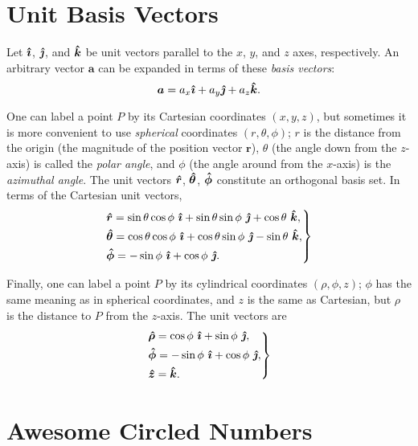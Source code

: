 \documentclass{article}
\begin{document}
\section{Unit Basis Vectors}

Let $\bm{\hat{\imath}}$, $\bm{\hat{\jmath}}$, and $\bm{\hat{k}}$ be unit vectors parallel to the $x$, $y$, and $z$ axes, respectively. An arbitrary vector $\bm{a}$ can be expanded in terms of these \emph{basis vectors}:
\begin{equation}
    \bm{a} = a_x \bm{\hat{\imath}} + a_y \bm{\hat{\jmath}} + a_z \bm{\hat{k}}.
\end{equation}

One can label a point $P$ by its Cartesian coordinates $(x, y, z)$, but sometimes it is more convenient to use \emph{spherical} coordinates $(r, \theta, \phi)$; $r$ is the distance from the origin (the magnitude of the position vector $\bm{r}$), $\theta$ (the angle down from the $z$-axis) is called the \emph{polar angle}, and $\phi$ (the angle around from the $x$-axis) is the \emph{azimuthal angle}. The unit vectors $\bm{\hat{r}}$, $\bm{\hat{\theta}}$, $\bm{\hat{\phi}}$ constitute an orthogonal basis set. In terms of the Cartesian unit vectors,
\begin{equation}
    \begin{rcases} \displaystyle \bm{\hat{r}} = \sin{\theta}\cos{\phi}\ \bm{\hat{\imath}} + \sin{\theta}\sin{\phi}\ \bm{\hat{\jmath}} + \cos{\theta}\ \bm{\hat{k}}, \\ \displaystyle \bm{\hat{\theta}} = \cos{\theta}\cos{\phi}\ \bm{\hat{\imath}} + \cos{\theta}\sin{\phi}\ \bm{\hat{\jmath}} - \sin{\theta}\ \bm{\hat{k}}, \\ \displaystyle \bm{\hat{\phi}} = -\sin{\phi}\ \bm{\hat{\imath}} + \cos{\phi}\ \bm{\hat{\jmath}}. \end{rcases}
\end{equation}

Finally, one can label a point $P$ by its cylindrical coordinates $(\rho, \phi, z)$; $\phi$ has the same meaning as in spherical coordinates, and $z$ is the same as Cartesian, but $\rho$ is the distance to $P$ from the $z$-axis. The unit vectors are
\begin{equation}
    \begin{rcases} \displaystyle \bm{\hat{\rho}} = \cos{\phi}\ \bm{\hat{\imath}} + \sin{\phi}\ \bm{\hat{\jmath}}, \\ \displaystyle \bm{\hat{\phi}} = -\sin{\phi}\ \bm{\hat{\imath}} + \cos{\phi}\ \bm{\hat{\jmath}}, \\ \displaystyle \bm{\hat{z}} = \bm{\hat{k}}. \end{rcases}
\end{equation}

\section{Awesome Circled Numbers}
\end{document}
